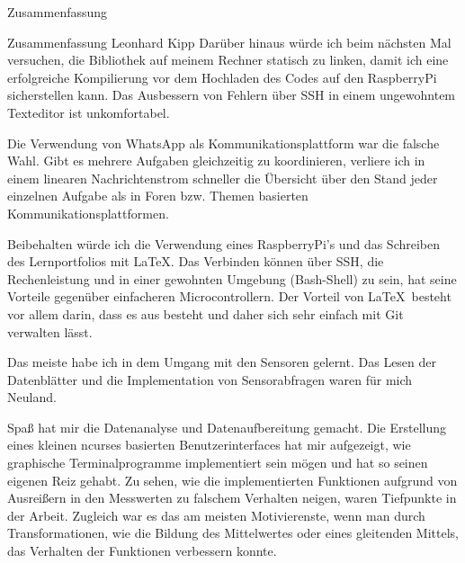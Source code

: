 \documentclass[12pt]{report}
\begin{document}
\begin{section}{Zusammenfassung}
\begin{subsection}{Zusammenfassung Leonhard Kipp}
    Darüber hinaus würde ich beim nächsten Mal versuchen, die \wiringPi{}
    Bibliothek auf meinem Rechner statisch zu linken, damit ich eine
    erfolgreiche Kompilierung vor dem Hochladen des Codes auf den RaspberryPi
    sicherstellen kann. Das Ausbessern von Fehlern über SSH in einem ungewohntem
    Texteditor ist unkomfortabel.

    Die Verwendung von WhatsApp als Kommunikationsplattform war die falsche
    Wahl. Gibt es mehrere Aufgaben gleichzeitig zu koordinieren, verliere ich in
    einem linearen Nachrichtenstrom schneller die Übersicht über den Stand jeder
    einzelnen Aufgabe als in Foren bzw. Themen basierten Kommunikationsplattformen.

    Beibehalten würde ich die Verwendung eines RaspberryPi's und das Schreiben
    des Lernportfolios mit \LaTeX. Das Verbinden
    können über SSH, die Rechenleistung und in einer gewohnten Umgebung
    (Bash-Shell) zu sein, hat seine Vorteile gegenüber einfacheren Microcontrollern.
    Der Vorteil von \LaTeX\ besteht vor allem darin, dass es aus 
    besteht und daher sich sehr einfach mit Git verwalten lässt.

    Das meiste habe ich in dem Umgang mit den Sensoren gelernt. Das Lesen der
    Datenblätter und die Implementation von Sensorabfragen waren für mich Neuland.

    Spaß hat mir die Datenanalyse und Datenaufbereitung gemacht. Die Erstellung
    eines kleinen ncurses basierten Benutzerinterfaces hat mir aufgezeigt, wie
    graphische Terminalprogramme implementiert sein mögen und hat so seinen
    eigenen Reiz gehabt. Zu sehen, wie die implementierten Funktionen
    aufgrund von Ausreißern in den Messwerten zu falschem Verhalten neigen,
    waren Tiefpunkte in der Arbeit. Zugleich war es das am meisten
    Motivierenste, wenn man durch Transformationen, wie die Bildung des
    Mittelwertes oder eines gleitenden Mittels, das Verhalten der Funktionen
    verbessern konnte.
       
  \end{subsection}
\end{section}
\end{document}
